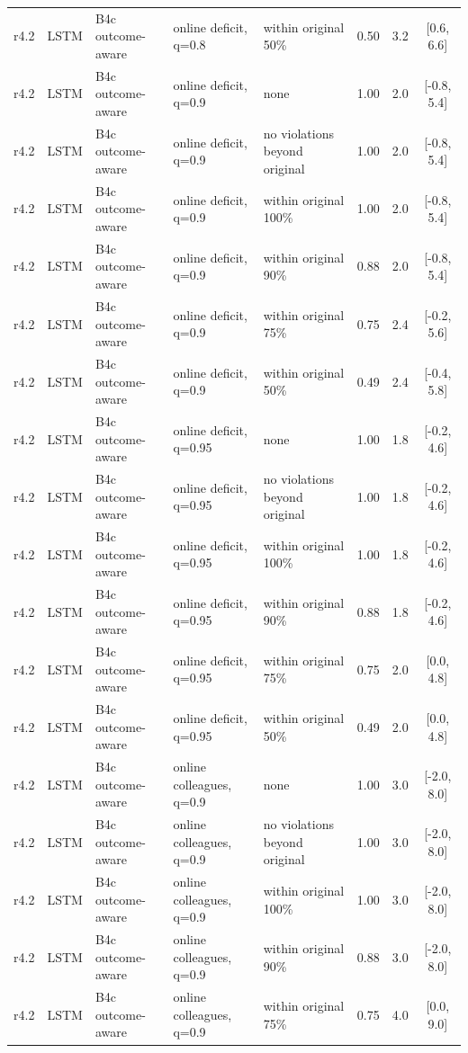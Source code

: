 \documentclass[10pt,onecolumn,letterpaper]{article}
\begin{document}
\begin{longtable}{lllp{4.2cm}p{3.4cm}ccc}
r4.2 & LSTM & B4c outcome-aware & online deficit, q=0.8 & within original 50\% & 0.50 & 3.2 & [0.6, 6.6] \\
r4.2 & LSTM & B4c outcome-aware & online deficit, q=0.9 & none & 1.00 & 2.0 & [-0.8, 5.4] \\
r4.2 & LSTM & B4c outcome-aware & online deficit, q=0.9 & no violations beyond original & 1.00 & 2.0 & [-0.8, 5.4] \\
r4.2 & LSTM & B4c outcome-aware & online deficit, q=0.9 & within original 100\% & 1.00 & 2.0 & [-0.8, 5.4] \\
r4.2 & LSTM & B4c outcome-aware & online deficit, q=0.9 & within original 90\% & 0.88 & 2.0 & [-0.8, 5.4] \\
r4.2 & LSTM & B4c outcome-aware & online deficit, q=0.9 & within original 75\% & 0.75 & 2.4 & [-0.2, 5.6] \\
r4.2 & LSTM & B4c outcome-aware & online deficit, q=0.9 & within original 50\% & 0.49 & 2.4 & [-0.4, 5.8] \\
r4.2 & LSTM & B4c outcome-aware & online deficit, q=0.95 & none & 1.00 & 1.8 & [-0.2, 4.6] \\
r4.2 & LSTM & B4c outcome-aware & online deficit, q=0.95 & no violations beyond original & 1.00 & 1.8 & [-0.2, 4.6] \\
r4.2 & LSTM & B4c outcome-aware & online deficit, q=0.95 & within original 100\% & 1.00 & 1.8 & [-0.2, 4.6] \\
r4.2 & LSTM & B4c outcome-aware & online deficit, q=0.95 & within original 90\% & 0.88 & 1.8 & [-0.2, 4.6] \\
r4.2 & LSTM & B4c outcome-aware & online deficit, q=0.95 & within original 75\% & 0.75 & 2.0 & [0.0, 4.8] \\
r4.2 & LSTM & B4c outcome-aware & online deficit, q=0.95 & within original 50\% & 0.49 & 2.0 & [0.0, 4.8] \\
r4.2 & LSTM & B4c outcome-aware & online colleagues, q=0.9 & none & 1.00 & 3.0 & [-2.0, 8.0] \\
r4.2 & LSTM & B4c outcome-aware & online colleagues, q=0.9 & no violations beyond original & 1.00 & 3.0 & [-2.0, 8.0] \\
r4.2 & LSTM & B4c outcome-aware & online colleagues, q=0.9 & within original 100\% & 1.00 & 3.0 & [-2.0, 8.0] \\
r4.2 & LSTM & B4c outcome-aware & online colleagues, q=0.9 & within original 90\% & 0.88 & 3.0 & [-2.0, 8.0] \\
r4.2 & LSTM & B4c outcome-aware & online colleagues, q=0.9 & within original 75\% & 0.75 & 4.0 & [0.0, 9.0] \\

\end{longtable}
\end{document}
